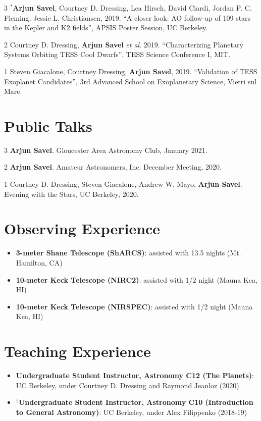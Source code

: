 \documentclass[letterpaper,10.5pt]{article}
\newcommand{\resumeItemNoBullet}[2]{
  \item[]\small{
    \hspace{-9pt}\textbf{#1}{: #2 \vspace{-6pt}}
  }
}
\newcommand{\resumeSubHeadingListEnd}{\end{itemize}}
\newcommand{\resumeItemListStart}{\begin{itemize}}
\newcommand{\resumeItemListEnd}{\end{itemize}\vspace{-5pt}}
\newcommand{\shorterSection}[1]{\vspace{-10pt}\section{#1}}
\begin{document}
\begin{list}{}{\cvlist}
\item[{\color{numcolor}\scriptsize3}] $^*$\textbf{Arjun Savel}, Courtney D. Dressing, Lea Hirsch, David Ciardi, Jordan P. C. Fleming, Jessie L. Christiansen, 2019. “A closer look: AO follow-up of 109 stars in the Kepler and K2 fields”, APSIS Poster Session, UC Berkeley.

\item[{\color{numcolor}\scriptsize2}] Courtney D. Dressing, \textbf{Arjun Savel} \textit{et al}. 2019. “Characterizing Planetary Systems Orbiting TESS Cool Dwarfs”, TESS Science Conference I, MIT.

\item[{\color{numcolor}\scriptsize1}] Steven Giacalone, Courtney Dressing, \textbf{Arjun Savel}, 2019. “Validation of TESS Exoplanet Candidates”, 3rd Advanced School on Exoplanetary Science, Vietri sul Mare.

\end{list}

\shorterSection{Public Talks}
\begin{list}{}{\cvlist}
\item[{\color{numcolor}\scriptsize3}] \textbf{Arjun Savel}. Gloucester Area Astronomy Club, January 2021.
\item[{\color{numcolor}\scriptsize2}] \textbf{Arjun Savel}. Amateur Astronomers, Inc. December Meeting, 2020.
\item[{\color{numcolor}\scriptsize1}] Courtney D. Dressing, Steven Giacalone, Andrew W. Mayo, \textbf{Arjun Savel}. Evening with the Stars, UC Berkeley, 2020.
\end{list}

\shorterSection{Observing Experience}
\resumeItemListStart
\resumeItemNoBullet{3-meter Shane Telescope (ShARCS)}{assisted with 13.5 nights (Mt. Hamilton, CA)}
\resumeItemNoBullet{10-meter Keck Telescope (NIRC2)}{assisted with 1/2 night (Mauna Kea, HI)}
\resumeItemNoBullet{10-meter Keck Telescope (NIRSPEC)}{assisted with 1/2 night (Mauna Kea, HI)}

\resumeSubHeadingListEnd
\shorterSection{Teaching Experience}
\resumeItemListStart
\resumeItemNoBullet{Undergraduate Student Instructor, Astronomy C12 (The Planets)}{UC Berkeley, under Courtney D. Dressing and Raymond Jeanloz (2020)}
\resumeItemNoBullet{$^\dagger$Undergraduate Student Instructor, Astronomy C10 (Introduction to General Astronomy)}{UC Berkeley, under Alex Filippenko (2018-19)}
\resumeItemListEnd
\end{document}

